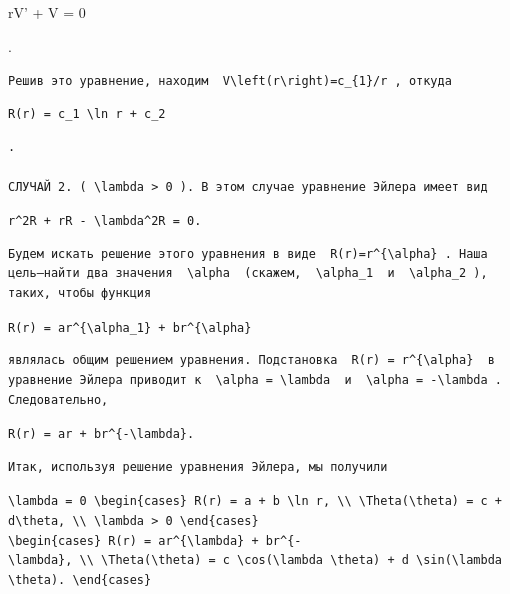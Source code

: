 \documentclass[
  ukrainian,
]{article}
\begin{document}
rV' + V = 0

.

\texttt{Решив\ это\ уравнение,\ находим\ \ \textquotesingle{}V\textbackslash{}left(r\textbackslash{}right)=c\_\{1\}/r\textquotesingle{}\ ,\ откуда}

\begin{verbatim}
R(r) = c_1 \ln r + c_2
\end{verbatim}

\begin{verbatim}
.

СЛУЧАЙ 2. ( \lambda > 0 ). В этом случае уравнение Эйлера имеет вид
\end{verbatim}

\texttt{r\^{}2R\textquotesingle{}\textquotesingle{}\ +\ rR\textquotesingle{}\ -\ \textbackslash{}lambda\^{}2R\ =\ 0.}

\begin{verbatim}
Будем искать решение этого уравнения в виде  R(r)=r^{\alpha} . Наша цель—найти два значения  \alpha  (скажем,  \alpha_1  и  \alpha_2 ), таких, чтобы функция
\end{verbatim}

\texttt{R(r)\ =\ ar\^{}\{\textbackslash{}alpha\_1\}\ +\ br\^{}\{\textbackslash{}alpha\}}

\begin{verbatim}
являлась общим решением уравнения. Подстановка  R(r) = r^{\alpha}  в уравнение Эйлера приводит к  \alpha = \lambda  и  \alpha = -\lambda . Следовательно,
\end{verbatim}

\texttt{R(r)\ =\ ar\textquotesingle{}\ +\ br\^{}\{-\textbackslash{}lambda\}.}

\begin{verbatim}
Итак, используя решение уравнения Эйлера, мы получили
\end{verbatim}

\texttt{\textbackslash{}lambda\ =\ 0\ \textbackslash{}begin\{cases\}\ R(r)\ =\ a\ +\ b\ \textbackslash{}ln\ r,\ \textbackslash{}\textbackslash{}\ \textbackslash{}Theta(\textbackslash{}theta)\ =\ c\ +\ d\textbackslash{}theta,\ \textbackslash{}\textbackslash{}\ \textbackslash{}lambda\ \textgreater{}\ 0\ \textbackslash{}end\{cases\}}
\texttt{\textbackslash{}begin\{cases\}\ R(r)\ =\ ar\^{}\{\textbackslash{}lambda\}\ +\ br\^{}\{-\textbackslash{}lambda\},\ \textbackslash{}\textbackslash{}\ \textbackslash{}Theta(\textbackslash{}theta)\ =\ c\ \textbackslash{}cos(\textbackslash{}lambda\ \textbackslash{}theta)\ +\ d\ \textbackslash{}sin(\textbackslash{}lambda\ \textbackslash{}theta).\ \textbackslash{}end\{cases\}}
\end{document}
